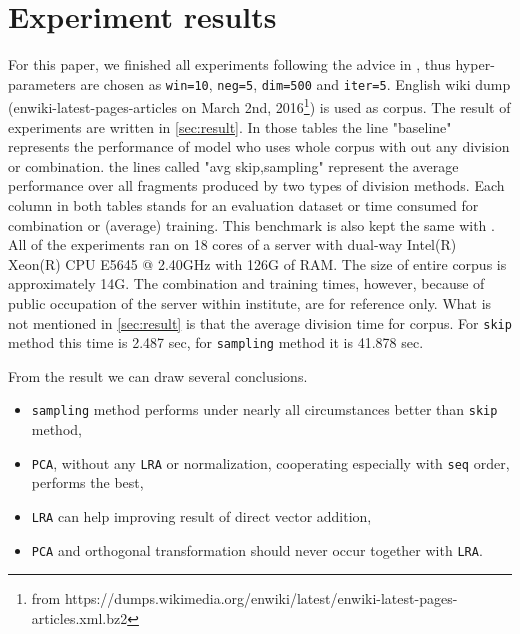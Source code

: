 \section{Experiment results} \label{experiment_results}
For this paper, we finished all experiments following the advice in \cite{levy2015improving}, thus hyper-parameters are chosen as \verb|win=10|, \verb|neg=5|, \verb|dim=500| and \verb|iter=5|. English wiki dump (enwiki-latest-pages-articles on March 2nd, 2016\footnote{from https://dumps.wikimedia.org/enwiki/latest/enwiki-latest-pages-articles.xml.bz2}) is used as corpus. The result of experiments are written in \ref{sec:result}. In those tables the line "baseline" represents the performance of model who uses whole corpus with out any division or combination. the lines called "avg {skip,sampling}" represent the average performance over all fragments produced by two types of division methods. Each column in both tables stands for an evaluation dataset or time consumed for combination or (average) training. This benchmark is also kept the same with \cite{levy2015improving}. All of the experiments ran on 18 cores of a server with dual-way Intel(R) Xeon(R) CPU E5645 @ 2.40GHz with 126G of RAM. The size of entire corpus is approximately 14G. The combination and training times, however, because of public occupation of the server within institute, are for reference only. What is not mentioned in \ref{sec:result} is that the average division time for corpus. For \verb|skip| method this time is 2.487 sec, for \verb|sampling| method it is 41.878 sec.

From the result we can draw several conclusions.
\begin{itemize}
	\item \verb|sampling| method performs under nearly all circumstances better than \verb|skip| method,
	\item \verb|PCA|, without any \verb|LRA| or normalization, cooperating especially with \verb|seq| order, performs the best,
	\item \verb|LRA| can help improving result of direct vector addition,
	\item \verb|PCA| and orthogonal transformation should never occur together with \verb|LRA|.
\end{itemize}


